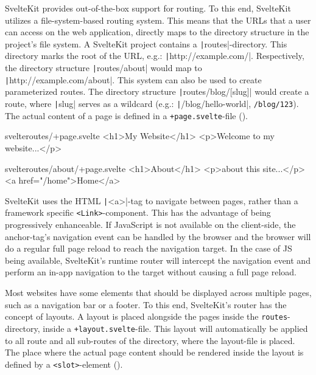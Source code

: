 SvelteKit provides out-of-the-box support for routing. To this end, SvelteKit utilizes a file-system-based routing system. This means that the URLs that a user can access on the web application, directly maps to the directory structure in the project's file system. A SvelteKit project contains a \texttt|routes|-directory. This directory marks the root of the URL, e.g.: \texttt|http://example.com/|. Respectively, the directory structure \texttt|routes/about| would map to \texttt|http://example.com/about|. This system can also be used to create parameterized routes. The directory structure \texttt|routes/blog/[slug]| would create a route, where \texttt|slug| serves as a wildcard (e.g.: \texttt|/blog/hello-world|, \texttt{/blog/123}). The actual content of a page is defined in a \texttt{+page.svelte}-file ().

\begin{listing}[h!]
\begin{myminted}{svelte}{routes/+page.svelte}
<h1>My Website</h1>
<p>Welcome to my website...</p>
\end{myminted}
\begin{myminted}{svelte}{routes/about/+page.svelte}
<h1>About</h1>
<p>about this site...</p>
<a href="/home">Home</a>
\end{myminted}
\caption{Example page-definitions in SvelteKit.}
\label{fig:sveltekit-page-file}
\end{listing}

SvelteKit uses the HTML \texttt|<a>|-tag to navigate between pages, rather than a framework specific \texttt{<Link>}-component. This has the advantage of being progressively enhanceable. If JavaScript is not available on the client-side, the anchor-tag's navigation event can be handled by the browser and the browser will do a regular full page reload to reach the navigation target. In the case of JS being available, SvelteKit's runtime router will intercept the navigation event and perform an in-app navigation to the target without causing a full page reload.

Most websites have some elements that should be displayed across multiple pages, such as a navigation bar or a footer. To this end, SvelteKit's router has the concept of layouts. A layout is placed alongside the pages inside the \texttt{routes}-directory, inside a \texttt{+layout.svelte}-file. This layout will automatically be applied to all route and all sub-routes of the directory, where the layout-file is placed. The place where the actual page content should be rendered inside the layout is defined by a \texttt{<slot>}-element ().

